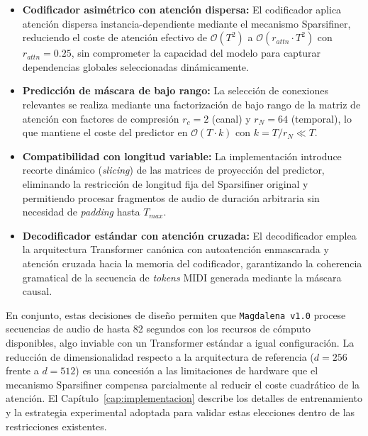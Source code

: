 \begin{itemize}
    \item \textbf{Codificador asimétrico con atención dispersa:} El codificador aplica
    atención dispersa instancia-dependiente mediante el mecanismo Sparsifiner, reduciendo
    el coste de atención efectivo de $\mathcal{O}(T^2)$ a $\mathcal{O}(r_{attn} \cdot T^2)$
    con $r_{attn} = 0.25$, sin comprometer la capacidad del modelo para capturar
    dependencias globales seleccionadas dinámicamente.

    \item \textbf{Predicción de máscara de bajo rango:} La selección de conexiones
    relevantes se realiza mediante una factorización de bajo rango de la matriz de atención
    con factores de compresión $r_c = 2$ (canal) y $r_N = 64$ (temporal), lo que mantiene
    el coste del predictor en $\mathcal{O}(T \cdot k)$ con $k = T / r_N \ll T$.

    \item \textbf{Compatibilidad con longitud variable:} La implementación introduce
    recorte dinámico (\textit{slicing}) de las matrices de proyección del predictor,
    eliminando la restricción de longitud fija del Sparsifiner original y permitiendo
    procesar fragmentos de audio de duración arbitraria sin necesidad de \textit{padding}
    hasta $T_{max}$.

    \item \textbf{Decodificador estándar con atención cruzada:} El decodificador emplea
    la arquitectura Transformer canónica con autoatención enmascarada y atención cruzada
    hacia la memoria del codificador, garantizando la coherencia gramatical de la
    secuencia de \textit{tokens} MIDI generada mediante la máscara causal.
\end{itemize}

En conjunto, estas decisiones de diseño permiten que
\texttt{Magdalena v1.0} procese secuencias de audio de hasta
82 segundos con los recursos de cómputo disponibles, algo
inviable con un Transformer estándar a igual configuración.
La reducción de dimensionalidad respecto a la arquitectura
de referencia ($d = 256$ frente a $d = 512$) es una concesión
a las limitaciones de hardware que el mecanismo Sparsifiner
compensa parcialmente al reducir el coste cuadrático de la
atención. El Capítulo~\ref{cap:implementacion} describe los
detalles de entrenamiento y la estrategia experimental adoptada
para validar estas elecciones dentro de las restricciones
existentes.
